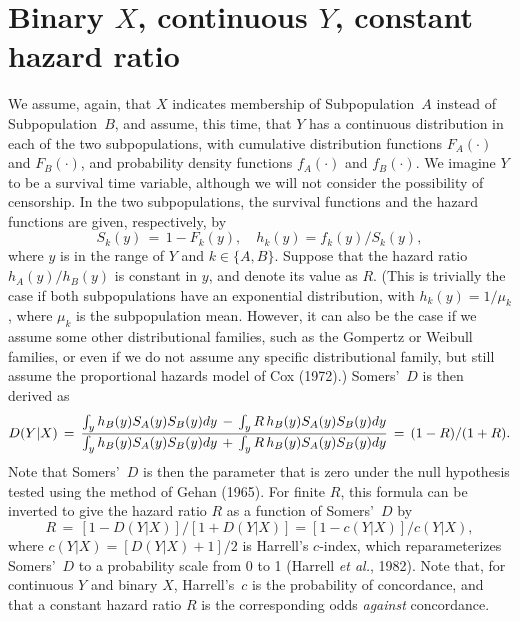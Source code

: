 \documentclass[a4paper,notitlepage]{article}      %
\begin{document}
\section{Binary $X$, continuous $Y$, constant hazard ratio}

We assume, again, that $X$ indicates membership of Subpopulation~$A$ instead of Subpopulation~$B$,
and assume, this time, that $Y$ has a continuous distribution in each of the two subpopulations,
with cumulative distribution functions $F_A(\cdot)$ and $F_B(\cdot)$,
and probability density functions $f_A(\cdot)$ and $f_B(\cdot)$.
We imagine $Y$ to be a survival time variable,
although we will not consider the possibility of censorship.
In the two subpopulations, the survival functions and the hazard functions are given, respectively, by
\begin{equation}
S_k(y) \, = \, 1-F_k(y), \quad h_k(y) = f_k(y)/S_k(y),
\label{equation:eqseq19}
\end{equation}
where $y$ is in the range of $Y$ and $k\in \{A,B\}$.
Suppose that the hazard ratio $h_A(y)/h_B(y)$ is constant in $y$,
and denote its value as $R$.
(This is trivially the case if both subpopulations have an exponential distribution,
with $h_k(y)=1/\mu_k$, where $\mu_k$ is the subpopulation mean.
However, it can also be the case if we assume some other distributional families,
such as the Gompertz or Weibull families,
or even if we do not assume any specific distributional family,
but still assume the proportional hazards model of Cox (1972)\cite{cox1972}.)
Somers'~$D$ is then derived as
\begin{equation}
D(Y|X) \, = \, {
{ \int_y h_B(y) S_A(y) S_B(y) dy \, - \, \int_y R \, h_B(y) S_A(y) S_B(y) dy }
\over
{ \int_y h_B(y) S_A(y) S_B(y) dy \, + \, \int_y R \, h_B(y) S_A(y) S_B(y) dy }
}
\, = \, (1-R)/(1+R) .
\label{eq:eqseq20}
\end{equation}
Note that Somers'~$D$ is then the parameter that is zero under the null hypothesis tested using the method of
Gehan (1965)\cite{gehan1965}.
For finite $R$, this formula can be inverted to give the hazard ratio $R$ as a function of Somers'~$D$ by
\begin{equation}
R \, = \, \left[ 1 - D(Y|X) \right] / \left[ 1 + D(Y|X) \right] = \left[ 1 - c(Y|X) \right]/c(Y|X) ,
\label{eq:eqseq21}
\end{equation}
where $c(Y|X)=[D(Y|X)+1]/2$ is Harrell's $c$-index,
which reparameterizes Somers'~$D$ to a probability scale from 0 to 1 (Harrell \textit{et al.}, 1982)\cite{harrell1982}.
Note that, for continuous $Y$ and binary $X$, Harrell's~$c$ is the probability of concordance,
and that a constant hazard ratio $R$ is the corresponding odds \textit{against} concordance.
\end{document}
